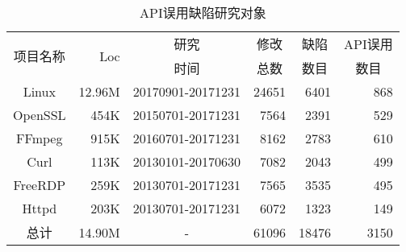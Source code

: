 \begin{table}[t]
	\centering
	\begin{minipage}[t]{0.8\linewidth} %
		\caption{API误用缺陷研究对象}
		\label{tab:2-3-statistics}
			\begin{tabular}{crcrrr}
			\hline
			\multirow{2}{*}{项目名称} & \multirow{2}{*}{Loc} & 研究 & \multicolumn{1}{c}{修改}& \multicolumn{1}{c}{缺陷}& \multicolumn{1}{c}{API误用}\\
			&  & 时间 & \multicolumn{1}{c}{总数} & \multicolumn{1}{c}{数目}& \multicolumn{1}{c}{数目} \\
			\hline
			Linux & 12.96M & 20170901-20171231 & 24651 & 6401 & 868 \\
			OpenSSL & 454K & 20150701-20171231 & 7564 & 2391 & 529 \\
			FFmpeg & 915K & 20160701-20171231 & 8162 & 2783 & 610 \\
			Curl & 113K & 20130101-20170630 & 7082 & 2043 & 499 \\
			FreeRDP & 259K & 20130701-20171231 & 7565 & 3535 & 495 \\
			Httpd & 203K & 20130701-20171231 & 6072 & 1323 & 149 \\
			\hline
			总计 & 14.90M & - & 61096& 18476 & 3150 \\
			\hline
		\end{tabular}
	\end{minipage}
\end{table}